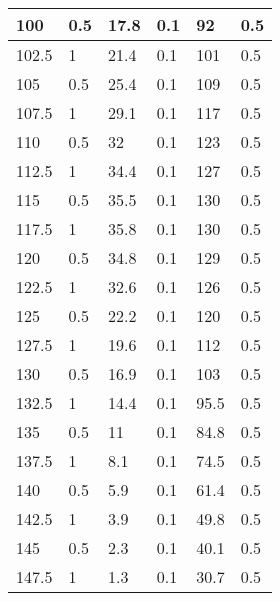 \begin{center}
\begin{longtable}{|l|l|l|l|l|l|}
100   & 0.5         & 17.8            & 0.1         & 92            & 0.5           \\ \hline
102.5 & 1           & 21.4            & 0.1         & 101           & 0.5           \\ \hline
105   & 0.5         & 25.4            & 0.1         & 109           & 0.5           \\ \hline
107.5 & 1           & 29.1            & 0.1         & 117           & 0.5           \\ \hline
110   & 0.5         & 32              & 0.1         & 123           & 0.5           \\ \hline
112.5 & 1           & 34.4            & 0.1         & 127           & 0.5           \\ \hline
115   & 0.5         & 35.5            & 0.1         & 130           & 0.5           \\ \hline
117.5 & 1           & 35.8            & 0.1         & 130           & 0.5           \\ \hline
120   & 0.5         & 34.8            & 0.1         & 129           & 0.5           \\ \hline
122.5 & 1           & 32.6            & 0.1         & 126           & 0.5           \\ \hline
125   & 0.5         & 22.2            & 0.1         & 120           & 0.5           \\ \hline
127.5 & 1           & 19.6            & 0.1         & 112           & 0.5           \\ \hline
130   & 0.5         & 16.9            & 0.1         & 103           & 0.5           \\ \hline
132.5 & 1           & 14.4            & 0.1         & 95.5          & 0.5           \\ \hline
135   & 0.5         & 11              & 0.1         & 84.8          & 0.5           \\ \hline
137.5 & 1           & 8.1             & 0.1         & 74.5          & 0.5           \\ \hline
140   & 0.5         & 5.9             & 0.1         & 61.4          & 0.5           \\ \hline
142.5 & 1           & 3.9             & 0.1         & 49.8          & 0.5           \\ \hline
145   & 0.5         & 2.3             & 0.1         & 40.1          & 0.5           \\ \hline
147.5 & 1           & 1.3             & 0.1         & 30.7          & 0.5           \\ \hline

\end{longtable}
\end{center}

